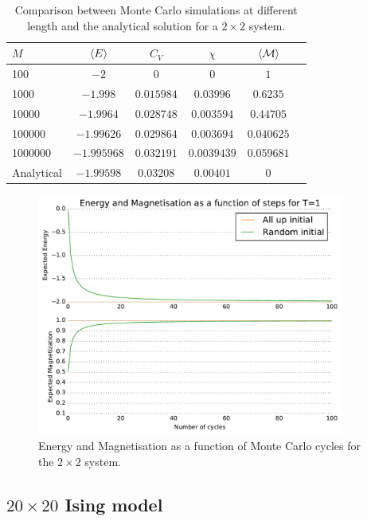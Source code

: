 \documentclass[10pt,a4paper]{amsart}
\begin{document}
\begin{table}
	\centering
	\caption{Comparison between Monte Carlo simulations at different length and the analytical solution for a $2\times2$ system.} \label{tab:2by2analMC}
	\begin{tabular}{lccccc} \hline
	$M$ & $\ev{E}$ & $C_V$ & $\chi$ & $\ev{\mathcal{M}}$ \\ \hline
	100         &  $-2$ & $0$ & $0$ & $1$ \\
	1000       & $-1.998$ & $0.015984$ & $0.03996$ & $0.6235$ \\
	10000     & $-1.9964$ & $0.028748$ & $0.003594$ & $0.44705$ \\
	100000   & $-1.99626$ & $0.029864$ & $0.003694$ & $0.040625$ \\
	1000000 & $-1.995968$ & $0.032191$ & $0.0039439$ & $0.059681$ \\ \hline
	Analytical & $ -1.99598 $ & $0.03208$ & $0.00401$ &  $0$ \\ \hline
	\end{tabular}
\end{table}

\begin{figure}
	\centering
	\includegraphics[width=0.9\textwidth]{../figures/EandM_2_T1_bothorient.pdf}
	\caption{Energy and Magnetisation as a function of Monte Carlo cycles for the $2\times2$ system. \label{fig:2by2simple}}
\end{figure}

\subsection{$20\times20$ Ising model}
\end{document}

